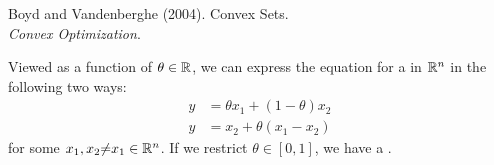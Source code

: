 \documentclass[11pt]{article}
\begin{document}
\newcommand{\relint}{\rvec{relint}}
\newcommand{\aff}{\rvec{aff}}
\newcommand{\conv}{\rvec{conv}}

\vspace{-1.7em}
{\scriptsize Boyd and Vandenberghe (2004). Convex Sets.\\ \textit{Convex Optimization}.\\ }


\begin{definition}
	Viewed as a function of $\theta \in \mathbb{R}$, we can express the equation for a  in $\mathbb{R}^n$ in the following two ways:
	\begin{align}
		y &= \theta x_1 + (1 - \theta) x_2 \\
		y &= x_2 + \theta (x_1 - x_2)
	\end{align}
	for some $x_1, x_2{\ne}x_1 \in \mathbb{R}^n$. If we restrict $\theta \in [0, 1]$, we have a . 
\end{definition}
\end{document}
